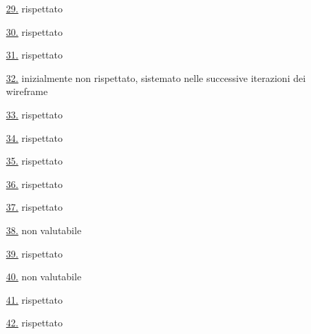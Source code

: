 \begin{itemize}
    \item[{\hyperref[lg:29]{29.}}] rispettato
    \item[{\hyperref[lg:30]{30.}}] rispettato
    \item[{\hyperref[lg:31]{31.}}] rispettato
    \item[{\hyperref[lg:32]{32.}}] inizialmente non rispettato, sistemato nelle successive iterazioni dei wireframe
    \item[{\hyperref[lg:33]{33.}}] rispettato
    \item[{\hyperref[lg:34]{34.}}] rispettato
    \item[{\hyperref[lg:35]{35.}}] rispettato
    \item[{\hyperref[lg:36]{36.}}] rispettato
    \item[{\hyperref[lg:37]{37.}}] rispettato
    \item[{\hyperref[lg:38]{38.}}] non valutabile
    \item[{\hyperref[lg:39]{39.}}] rispettato
    \item[{\hyperref[lg:40]{40.}}] non valutabile
    \item[{\hyperref[lg:41]{41.}}] rispettato
    \item[{\hyperref[lg:42]{42.}}] rispettato
\end{itemize}
